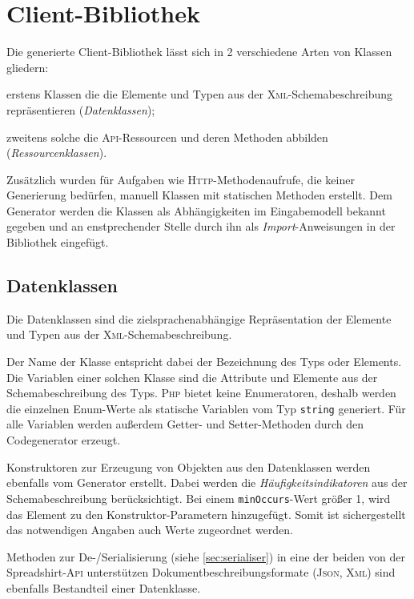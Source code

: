 \section{Client-Bibliothek}
\label{sec:client_library}

Die generierte Client-Bibliothek lässt sich in 2 verschiedene Arten von Klassen gliedern:
\begin{compactitem}
    \item[] erstens Klassen die die Elemente und Typen aus der \textsc{Xml}-Schemabeschreibung repräsentieren (\emph{Datenklassen});
    \item[] zweitens solche die \textsc{Api}-Ressourcen und deren Methoden abbilden (\emph{Ressourcenklassen}).
\end{compactitem}

Zusätzlich wurden für Aufgaben wie \textsc{Http}-Methodenaufrufe, die keiner Generierung bedürfen, manuell Klassen mit statischen Methoden erstellt. Dem Generator werden die Klassen als Abhängigkeiten im Eingabemodell bekannt gegeben und an enstprechender Stelle durch ihn als \emph{Import}-Anweisungen in der Bibliothek eingefügt.

\subsection{Datenklassen}
\label{sec:dataclasses}

Die Datenklassen sind die zielsprachenabhängige Repräsentation der Elemente und Typen aus der \textsc{Xml}-Schemabeschreibung. 

Der Name der Klasse entspricht dabei der Bezeichnung des Typs oder Elements. Die Variablen einer solchen Klasse sind die Attribute und Elemente aus der Schemabeschreibung des Typs. \textsc{Php} bietet keine Enumeratoren, deshalb werden die einzelnen Enum-Werte als statische Variablen vom Typ \texttt{string} generiert. Für alle Variablen werden außerdem Getter- und Setter-Methoden durch den Codegenerator erzeugt.

Konstruktoren zur Erzeugung von Objekten aus den Datenklassen werden ebenfalls vom Generator erstellt. Dabei werden die \emph{Häufigkeitsindikatoren} aus der Schemabeschreibung berücksichtigt. Bei einem \texttt{minOccurs}-Wert größer 1, wird das Element zu den Konstruktor-Parametern hinzugefügt. Somit ist sichergestellt das notwendigen Angaben auch Werte zugeordnet werden.

Methoden zur De-/Serialisierung (siehe \cref{sec:serialiser}) in eine der beiden von der Spreadshirt-\textsc{Api} unterstützen Dokumentbeschreibungsformate (\textsc{Json}, \textsc{Xml}) sind ebenfalls Bestandteil einer Datenklasse.


